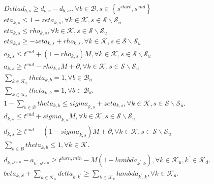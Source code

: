 \begin{align}
  & \mathit{Delta} d_{b , s} \geq {d}_{b , s} - d_{b , s} . , \forall b \in \mathcal{B} , s \in \left\{s^{start} , s^{end}\right\} \tag{eq\_0020\_b} \\
  & \mathit{eta}_{k , s} \leq 1 - \mathit{zeta}_{k , s} , \forall k \in \mathcal{K} , s \in \mathcal{S} \backslash \mathcal{S}_{u} \tag{eq\_0021\_a} \\
  & \mathit{eta}_{k , s} \leq \mathit{rho}_{k , s} , \forall k \in \mathcal{K} , s \in \mathcal{S} \backslash \mathcal{S}_{u} \tag{eq\_0021\_b} \\
  & \mathit{eta}_{k , s} \geq - \mathit{zeta}_{k , s} + \mathit{rho}_{k , s} , \forall k \in \mathcal{K} , s \in \mathcal{S} \backslash \mathcal{S}_{u} \tag{eq\_0021\_c} \\
  & a_{k , s} \leq t^{end} + \left(1 - \mathit{rho}_{k , s}\right) M , \forall k \in \mathcal{K} , s \in \mathcal{S} \backslash \mathcal{S}_{u} \tag{eq\_0022\_a} \\
  & a_{k , s} \geq t^{end} - \mathit{rho}_{k , s} M + \partial , \forall k \in \mathcal{K} , s \in \mathcal{S} \backslash \mathcal{S}_{u} \tag{eq\_0022\_b} \\
  & \sum_{k \in \mathcal{K}_{u}} \mathit{theta}_{k , b} = 1 , \forall b \in \mathcal{B}_{u} \tag{eq\_0024\_a} \\
  & \sum_{k \in \mathcal{K}_{d}} \mathit{theta}_{k , b} = 1 , \forall b \in \mathcal{B}_{d} . \tag{eq\_0024\_b} \\
  & 1 - \sum_{b \in \mathcal{B}} \mathit{theta}_{k , b} \leq \mathit{sigma}_{k , s} + \mathit{zeta}_{k , s} , \forall k \in \mathcal{K} , s \in \mathcal{S} \backslash \mathcal{S}_{u} . \tag{eq\_0026} \\
  & d_{k , s} \leq t^{end} + \mathit{sigma}_{k , s} M , \forall k \in \mathcal{K} , s \in \mathcal{S} \backslash \mathcal{S}_{u} \tag{eq\_0027\_a} \\
  & d_{k , s} \geq t^{end} - \left(1 - \mathit{sigma}_{k , s}\right) M + \partial , \forall k \in \mathcal{K} , s \in \mathcal{S} \backslash \mathcal{S}_{u} \tag{eq\_0027\_b} \\
  & \sum_{b \in B} \mathit{theta}_{k , b} \leq 1 , \forall k \in \mathcal{K} . \tag{eq\_0028} \\
  & d_{k , s^{turn}} - a_{k^{'} , s^{turn}} \geq t^{turn,min} - M \left(1 - \mathit{lambda}_{k^{'} , k}\right) , \forall k \in \mathcal{K}_{u} , k^{'} \in \mathcal{K}_{d} . \tag{eq\_0029} \\
  & \mathit{beta}_{k , S} + \sum_{k \in \mathcal{K}_{u}} \mathit{delta}_{k , k^{'}} \geq \sum_{k \in \mathcal{K}_{u}} \mathit{lambda}_{k^{'} , k} , \forall k \in \mathcal{K}_{d} . \tag{eq\_0031} \\

\end{align}
